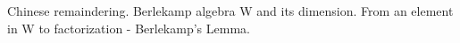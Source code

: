 
\noindent

Chinese remaindering. Berlekamp algebra W and its dimension. From an element in W to factorization - Berlekamp's Lemma.